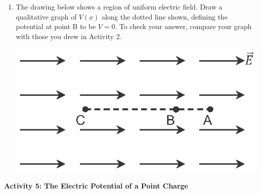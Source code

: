 \begin{enumerate}[labparts]
\item The drawing below shows a region of uniform electric field.  Draw a qualitative graph of $V(x)$ along the dotted line shown, defining the potential at point B to be $V=0$.  To check your answer, compare your graph with those you drew in Activity 2.  \label{part_potential_intro_draw_V} 

\begin{center}
\includegraphics{potential_intro/activity_5_figs/uniform_E_field_3.eps}
\hspace{0.5in}
\begin{lab_axis}[lab_noticks_2quads_algebraic,
	width={2.3in}, height={2.2in},
	xlabel={$x$},
	ylabel={$V$},
	xtick={0.2, 0.6, 0.8},
	xticklabels = {C, B, A},
	]
\end{lab_axis}
\end{center}


\end{enumerate}

\textbf{Activity 5: The Electric Potential of a Point Charge}

